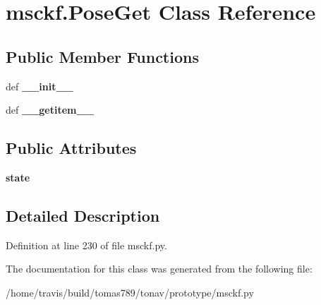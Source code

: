\hypertarget{classmsckf_1_1_pose_get}{\section{msckf.\-Pose\-Get Class Reference}
\label{classmsckf_1_1_pose_get}
}
\subsection*{Public Member Functions}
\begin{DoxyCompactItemize}
\item 
\hypertarget{classmsckf_1_1_pose_get_a3a5b9917934e12b4d6a98a95f87db759}{def {\bfseries \-\_\-\-\_\-init\-\_\-\-\_\-}}\label{classmsckf_1_1_pose_get_a3a5b9917934e12b4d6a98a95f87db759}

\item 
\hypertarget{classmsckf_1_1_pose_get_aa67fbb72a16db07345b41a2d4ca6e9f6}{def {\bfseries \-\_\-\-\_\-getitem\-\_\-\-\_\-}}\label{classmsckf_1_1_pose_get_aa67fbb72a16db07345b41a2d4ca6e9f6}

\end{DoxyCompactItemize}
\subsection*{Public Attributes}
\begin{DoxyCompactItemize}
\item 
\hypertarget{classmsckf_1_1_pose_get_a75b39f2276ee24bc71dbbd5ce43ec585}{{\bfseries state}}\label{classmsckf_1_1_pose_get_a75b39f2276ee24bc71dbbd5ce43ec585}

\end{DoxyCompactItemize}


\subsection{Detailed Description}


Definition at line 230 of file msckf.\-py.



The documentation for this class was generated from the following file\-:\begin{DoxyCompactItemize}
\item 
/home/travis/build/tomas789/tonav/prototype/msckf.\-py\end{DoxyCompactItemize}
